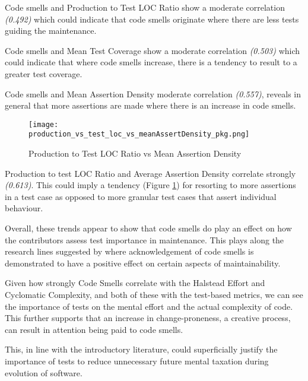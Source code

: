 Code smells and Production to Test LOC Ratio show a moderate correlation \textit{(0.492)} which could indicate that code smells originate where there are less tests guiding the maintenance. 

Code smells and Mean Test Coverage show a moderate correlation \textit{(0.503)} which could indicate that where code smells increase, there is a tendency to result to a greater test coverage. 

Code smells and Mean Assertion Density moderate correlation \textit{(0.557)}, reveals in general that more assertions are made where there is an increase in code smells. 

\begin{figure}[H]
	\texttt{[image: production\_vs\_test\_loc\_vs\_meanAssertDensity\_pkg.png]}
	\caption{Production to Test LOC Ratio vs Mean Assertion Density}
	\label{fig:prodtestRatioVsMeanAssertDensity}  
\end{figure}

Production to test LOC Ratio and Average Assertion Density correlate strongly \textit{(0.613)}. This could imply a tendency (Figure \ref{fig:prodtestRatioVsMeanAssertDensity}) for resorting to more assertions in a test case as opposed to more granular test cases that assert individual behaviour.

Overall, these trends appear to show that code smells do play an effect on how the contributors assess test importance in maintenance. This plays along the research lines suggested by \textcite{palomba2018diffuseness} where acknowledgement of code smells is demonstrated to have a positive effect on certain aspects of maintainability.

Given how strongly Code Smells correlate with the Halstead Effort and Cyclomatic Complexity, and both of these with the test-based metrics, we can see the importance of tests on the mental effort and the actual complexity of code. This further supports that an increase in change-proneness, a creative process, can result in attention being paid to code smells. 

This, in line with the introductory literature, could superficially justify the importance of tests to reduce unnecessary future mental taxation during evolution of software. 